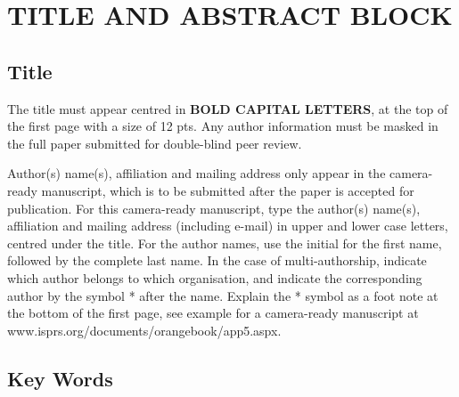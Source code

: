 \documentclass{isprs} %
\begin{document}
\section{TITLE AND ABSTRACT BLOCK}\label{sec:TITLE AND ABSTRACT BLOCK}

\subsection{Title}\label{sec:Title}

The title must appear centred in \textbf{BOLD CAPITAL LETTERS}, at the top of the first page with a size of 12 pts. Any author information must be masked in the full paper submitted for double-blind peer review.

Author(s) name(s), affiliation and mailing address only appear in the camera-ready manuscript, which is to be submitted after the paper is accepted for publication. For this camera-ready manuscript, type the author(s) name(s), affiliation and mailing address (including e-mail) in upper and lower case letters, centred under the title. For the author names, use the initial for the first name, followed by the complete last name. In the case of multi-authorship, indicate which author belongs to which organisation, and indicate the corresponding author by the symbol * after the name. Explain the * symbol as a foot note at the bottom of the first page, see example for a camera-ready manuscript at www.isprs.org/documents/orangebook/app5.aspx.




\subsection{Key Words}\label{sec:Key Words}
\end{document}
